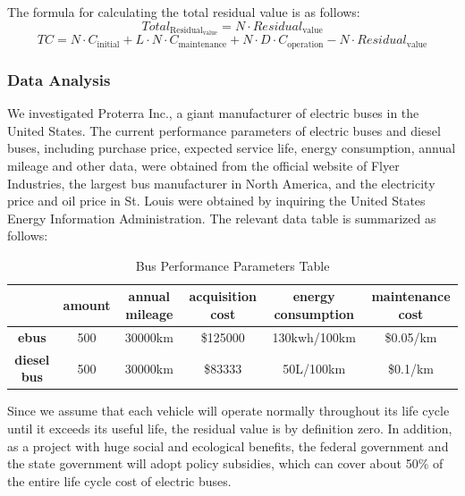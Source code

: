 \documentclass[12pt]{article}
\begin{document}
The formula for calculating the total residual value is as follows:
\begin{equation}
    Total_{\text{Residual}_{\text{value}}}=N \cdot Residual_{\text{value}}
\end{equation}
\begin{equation}
	TC=N \cdot C_{\text{initial}}+L \cdot N \cdot C_{\text{maintenance}}+N \cdot D \cdot C_{\text{operation}} -N \cdot Residual_{\text{value}}
\end{equation}

\subsubsection{Data Analysis}
We investigated Proterra Inc., a giant manufacturer of electric buses in the United States. The current performance parameters of 
electric buses and diesel buses, including purchase price, expected service life, energy consumption, annual mileage and other data, 
were obtained from the official website of Flyer Industries, the largest bus manufacturer in North America, and the electricity price 
and oil price in St. Louis were obtained by inquiring the United States Energy Information Administration. The relevant data table is 
summarized as follows:
\begin{table}[!htbp]
	\centering
	\caption{Bus Performance Parameters Table}
	\begin{tabular}{|c|c|c|c|c|c|}
	\hline
	  &\textbf{amount} & \textbf{annual mileage} &\textbf{acquisition cost}&\textbf{energy consumption}&\textbf{maintenance cost}\\
	\hline
	\textbf{ebus} & 500 & 30000km&\$125000&130kwh/100km& \$0.05/km\\
	\hline
	\textbf{diesel bus} & 500& 30000km&\$83333&50L/100km&\$0.1/km\\
	\hline
	\end{tabular}
\end{table}


Since we assume that each vehicle will operate normally throughout its life cycle until it exceeds its useful life, the residual 
value is by definition zero. In addition, as a project with huge social and ecological benefits, the federal government and the state 
government will adopt policy subsidies, which can cover about 50\% of the entire life cycle cost of electric buses.
\end{document}
